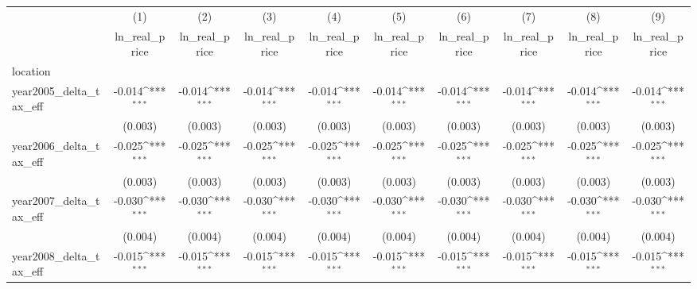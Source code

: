 {
\def\sym#1{\ifmmode^{#1}\else\(^{#1}\)\fi}
\begin{tabular}{l*{9}{c}}
\hline\hline
            &\multicolumn{1}{c}{(1)}&\multicolumn{1}{c}{(2)}&\multicolumn{1}{c}{(3)}&\multicolumn{1}{c}{(4)}&\multicolumn{1}{c}{(5)}&\multicolumn{1}{c}{(6)}&\multicolumn{1}{c}{(7)}&\multicolumn{1}{c}{(8)}&\multicolumn{1}{c}{(9)}\\
            &\multicolumn{1}{c}{ln_real_price}&\multicolumn{1}{c}{ln_real_price}&\multicolumn{1}{c}{ln_real_price}&\multicolumn{1}{c}{ln_real_price}&\multicolumn{1}{c}{ln_real_price}&\multicolumn{1}{c}{ln_real_price}&\multicolumn{1}{c}{ln_real_price}&\multicolumn{1}{c}{ln_real_price}&\multicolumn{1}{c}{ln_real_price}\\
\hline
location    &                     &                     &                     &                     &                     &                     &                     &                     &                     \\
year2005_delta_tax_eff&      -0.014\sym{***}&      -0.014\sym{***}&      -0.014\sym{***}&      -0.014\sym{***}&      -0.014\sym{***}&      -0.014\sym{***}&      -0.014\sym{***}&      -0.014\sym{***}&      -0.014\sym{***}\\
            &     (0.003)         &     (0.003)         &     (0.003)         &     (0.003)         &     (0.003)         &     (0.003)         &     (0.003)         &     (0.003)         &     (0.003)         \\
[1em]
year2006_delta_tax_eff&      -0.025\sym{***}&      -0.025\sym{***}&      -0.025\sym{***}&      -0.025\sym{***}&      -0.025\sym{***}&      -0.025\sym{***}&      -0.025\sym{***}&      -0.025\sym{***}&      -0.025\sym{***}\\
            &     (0.003)         &     (0.003)         &     (0.003)         &     (0.003)         &     (0.003)         &     (0.003)         &     (0.003)         &     (0.003)         &     (0.003)         \\
[1em]
year2007_delta_tax_eff&      -0.030\sym{***}&      -0.030\sym{***}&      -0.030\sym{***}&      -0.030\sym{***}&      -0.030\sym{***}&      -0.030\sym{***}&      -0.030\sym{***}&      -0.030\sym{***}&      -0.030\sym{***}\\
            &     (0.004)         &     (0.004)         &     (0.004)         &     (0.004)         &     (0.004)         &     (0.004)         &     (0.004)         &     (0.004)         &     (0.004)         \\
[1em]
year2008_delta_tax_eff&      -0.015\sym{***}&      -0.015\sym{***}&      -0.015\sym{***}&      -0.015\sym{***}&      -0.015\sym{***}&      -0.015\sym{***}&      -0.015\sym{***}&      -0.015\sym{***}&      -0.015\sym{***}\\

\end{tabular}}
